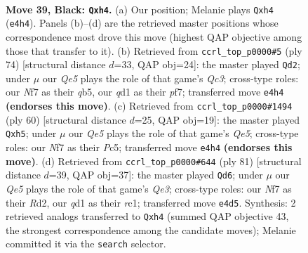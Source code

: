 \documentclass[11pt]{article}
\begin{document}
\clearpage

\begin{figure}[p]\centering
\begin{subfigure}{0.46\textwidth}\centering
\resizebox{\linewidth}{!}{%
\newchessgame
\chessboard[
  setfen={1k6/p1p2npp/1p2p3/2p3P1/4q2P/2P5/1P6/K2Q4 b - - 2 39},
  showmover=false,
  pgfstyle=straightmove, color=movearrow, markmove={e4-h4}
]}
\caption{}
\end{subfigure}\hfill
\begin{subfigure}{0.46\textwidth}\centering
\resizebox{\linewidth}{!}{%
\newchessgame
\chessboard[
  setfen={8/5ppk/4p3/1q5p/4P3/2Q2PP1/1P4KP/8 w - - 8 38},
  showmover=false,
  pgfstyle=straightmove, color=movearrow, markmove={c3-d2}
]}
\caption{}
\end{subfigure}
\\[4pt]
\begin{subfigure}{0.46\textwidth}\centering
\resizebox{\linewidth}{!}{%
\newchessgame
\chessboard[
  setfen={3q2k1/1p3p2/2p4p/2P1Q2p/p7/P3P1P1/5PK1/8 w - - 0 31},
  showmover=false,
  pgfstyle=straightmove, color=movearrow, markmove={e5-h5}
]}
\caption{}
\end{subfigure}\hfill
\begin{subfigure}{0.46\textwidth}\centering
\resizebox{\linewidth}{!}{%
\newchessgame
\chessboard[
  setfen={5Q2/7p/1p2q1p1/p4pk1/8/P3P1PP/3r1P2/2R3K1 b - - 0 41},
  showmover=false,
  pgfstyle=straightmove, color=movearrow, markmove={e6-d6}
]}
\caption{}
\end{subfigure}
\caption{\textbf{Move 39, Black: \texttt{Qxh4}.} (a) Our position; Melanie plays \texttt{Qxh4} (\texttt{e4h4}). Panels (b)--(d) are the retrieved master positions whose correspondence most drove this move (highest QAP objective among those that transfer to it). (b) Retrieved from \texttt{ccrl\_top\_p0000\#5} (ply 74) [structural distance $d$=33, QAP obj=24]: the master played \texttt{Qd2}; under $\mu$ our \emph{Qe5} plays the role of that game's \emph{Qc3}; cross-type roles: our \emph{N}f7 as their \emph{q}b5, our \emph{q}d1 as their \emph{p}f7; transferred move \texttt{e4h4} \textbf{(endorses this move)}. (c) Retrieved from \texttt{ccrl\_top\_p0000\#1494} (ply 60) [structural distance $d$=25, QAP obj=19]: the master played \texttt{Qxh5}; under $\mu$ our \emph{Qe5} plays the role of that game's \emph{Qe5}; cross-type roles: our \emph{N}f7 as their \emph{P}c5; transferred move \texttt{e4h4} \textbf{(endorses this move)}. (d) Retrieved from \texttt{ccrl\_top\_p0000\#644} (ply 81) [structural distance $d$=39, QAP obj=37]: the master played \texttt{Qd6}; under $\mu$ our \emph{Qe5} plays the role of that game's \emph{Qe3}; cross-type roles: our \emph{N}f7 as their \emph{R}d2, our \emph{q}d1 as their \emph{r}c1; transferred move \texttt{e4d5}. Synthesis: 2 retrieved analogs transferred to \texttt{Qxh4} (summed QAP objective 43, the strongest correspondence among the candidate moves); Melanie committed it via the \texttt{search} selector.}
\label{fig:thought-m77}
\end{figure}
\end{document}

